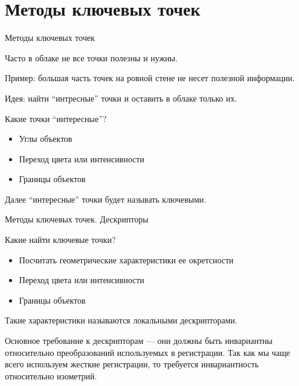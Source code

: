 \documentclass[6pt,pdf,utf8,russian]{beamer}
\begin{document}
\section{Методы ключевых точек}

\begin{frame}[fragile]{Методы ключевых точек}
    \begin{block}{}
        Часто в облаке не все точки полезны и нужны.

        Пример: большая часть точек на ровной стене не несет полезной информации.
    \end{block}

    \pause

    \begin{block}{}
        Идея: найти ``интресные'' точки и оставить в облаке только их.
    \end{block}

    \pause

    \begin{block}{}
        Какие точки ``интересные''?
        \begin{itemize}
            \item Углы объектов
            \item Переход цвета или интенсивности
            \item Границы объектов
        \end{itemize}
    \end{block}

    \pause

    \begin{block}{}
        Далее ``интересные'' точки будет называть ключевыми.
    \end{block}
\end{frame}

\begin{frame}[fragile]{Методы ключевых точек. Дескрипторы}
    \begin{block}{}
        Какие найти ключевые точки?
        \begin{itemize}
            \item Посчитать геометрические характеристики ее окретсности
            \item Переход цвета или интенсивности
            \item Границы объектов
        \end{itemize}
    \end{block}

    \pause

    \begin{block}{}
        Такие характеристики называются локальными дескрипторами.
    \end{block}

    \pause

    \begin{block}{}
        Основное требование к дескрипторам --- они должны быть инвариантны относительно преобразований используемых в регистрации.
        Так как мы чаще всего используем жесткие регистрации, то требуется инвариантность относительно изометрий.
    \end{block}

\end{frame}
\end{document}
